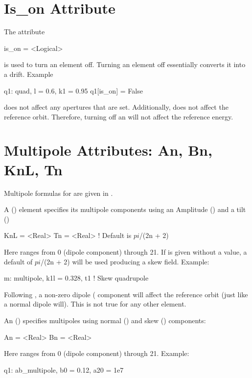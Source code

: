 \section{Is_on Attribute}
\label{s:is.on}

The  attribute
\begin{example}
  is_on = <Logical>
\end{example}
is used to turn an element off. Turning
an element off essentially converts it into a drift.
Example
\begin{example}
  q1: quad, l = 0.6, k1 = 0.95
  q1[is_on] = False
\end{example}

 does not affect any apertures that are set. Additionally,
 does not affect the reference orbit. Therefore, turning 
off an  will not affect the reference energy.

\section{Multipole Attributes: An, Bn, KnL, Tn}
\label{s:multip}

Multipole formulas for are given in . 

A  () element specifies its multipole
components using an Amplitude () and a tilt ()
\begin{example}
  KnL = <Real>
  Tn  = <Real>  ! Default is $pi$/(2n + 2)
\end{example}
Here  ranges from 0 (dipole component) through 21.  If 
is given without a value, a default of $pi$/(2n + 2) will be used
producing a skew field. Example:
\begin{example}
  m: multipole, k1l = 0.328, t1  ! Skew quadrupole
\end{example}
Following , a non-zero dipole ( component will affect
the reference orbit (just like a normal dipole will). This is not true
for any other element.

An  () specifies multipoles using normal
() and skew () components:
\begin{example}
  An = <Real>
  Bn = <Real>
\end{example}
Here  ranges from 0 (dipole component) through 21. Example:
\begin{example}
  q1: ab_multipole, b0 = 0.12, a20 = 1e7
\end{example}

